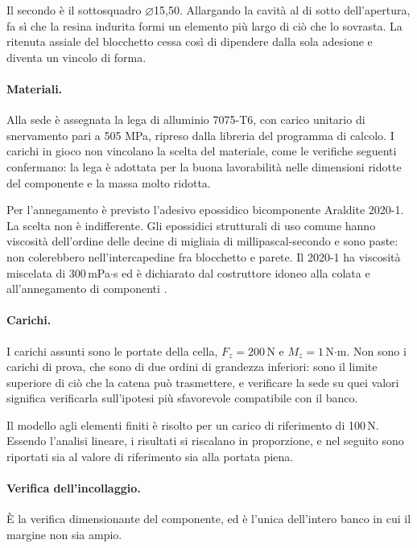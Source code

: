 Il secondo è il sottosquadro $\varnothing$15,50. Allargando la cavità al di
sotto dell'apertura, fa sì che la resina indurita formi un elemento più largo di
ciò che lo sovrasta. La ritenuta assiale del blocchetto cessa così di dipendere
dalla sola adesione e diventa un vincolo di forma.

\paragraph{Materiali.}
Alla sede è assegnata la lega di alluminio 7075-T6, con carico unitario di snervamento pari a 505 MPa, ripreso dalla libreria del programma di calcolo. I carichi in gioco non vincolano la scelta del materiale, come le verifiche seguenti confermano: la lega è adottata per la buona lavorabilità nelle dimensioni ridotte del componente e la massa molto ridotta.

Per l'annegamento è previsto l'adesivo epossidico bicomponente Araldite 2020-1.
La scelta non è indifferente. Gli epossidici strutturali di uso comune hanno
viscosità dell'ordine delle decine di migliaia di millipascal-secondo e sono
paste: non colerebbero nell'intercapedine fra blocchetto e parete. Il 2020-1 ha
viscosità miscelata di 300\,mPa$\cdot$s ed è dichiarato dal costruttore idoneo
alla colata e all'annegamento di componenti \cite{araldite2020}.

\paragraph{Carichi.}
I carichi assunti sono le portate della cella, $F_z = 200$\,N e
$M_z = 1$\,N$\cdot$m. Non sono i carichi di prova, che sono di due ordini di
grandezza inferiori: sono il limite superiore di ciò che la catena può
trasmettere, e verificare la sede su quei valori significa verificarla
sull'ipotesi più sfavorevole compatibile con il banco.

Il modello agli elementi finiti è risolto per un carico di riferimento di
100\,N. Essendo l'analisi lineare, i risultati si riscalano in proporzione, e
nel seguito sono riportati sia al valore di riferimento sia alla portata piena.

\paragraph{Verifica dell'incollaggio.}
È la verifica dimensionante del componente, ed è l'unica dell'intero banco in
cui il margine non sia ampio.

